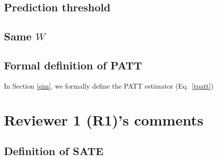 \documentclass[hidelinks,12pt,letterpaper]{article}
\begin{document}
\subsection{Prediction threshold}

\subsection{Same $W$}


\subsection{Formal definition of PATT}

In Section \ref{sim}, we formally define the PATT estimator (Eq.~\eqref{tpatt})

\section{Reviewer 1 (R1)'s comments}

\subsection{Definition of SATE} \label{SATE-def}
\end{document}
